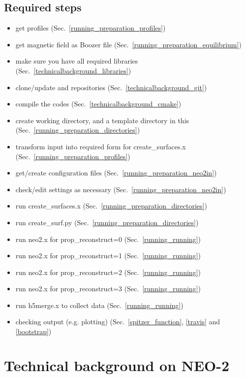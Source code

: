 \documentclass{article}
\newcommand{\vv}[1]{\texttt{\detokenize{#1}}}
\begin{document}
\subsection{Required steps}
\begin{itemize}
  \item get profiles (Sec.~\ref{running_preparation_profiles})
  \item get magnetic field as Boozer file (Sec.~\ref{running_preparation_equilibrium})
  \item make sure you have all required libraries (Sec.~\ref{technicalbackground_libraries})
  \item clone/update \vv{libneo} and \vv{NEO-2} repositories (Sec.~\ref{technicalbackground_git})
  \item compile the codes (Sec.~\ref{technicalbackground_cmake})
  \item create working directory, and a template directory in this (Sec.~\ref{running_preparation_directories})
  \item transform input into required form for create\_surfaces.x (Sec.~\ref{running_preparation_profiles})
  \item get/create configuration files (Sec.~\ref{running_preparation_neo2in})
  \item check/edit settings as necessary (Sec.~\ref{running_preparation_neo2in})
  \item run create\_surfaces.x (Sec.~\ref{running_preparation_directories})
  \item run create\_surf.py (Sec.~\ref{running_preparation_directories})
  \item run neo2.x for prop\_reconstruct=0 (Sec.~\ref{running_running})
  \item run neo2.x for prop\_reconstruct=1 (Sec.~\ref{running_running})
  \item run neo2.x for prop\_reconstruct=2 (Sec.~\ref{running_running})
  \item run neo2.x for prop\_reconstruct=3 (Sec.~\ref{running_running})
  \item run h5merge.x to collect data (Sec.~\ref{running_running})
  \item checking output (e.g. plotting) (Sec.~\ref{spitzer_function}, \ref{travis} and \ref{bootstrap})
\end{itemize}

\section{Technical background on NEO-2}
\end{document}
